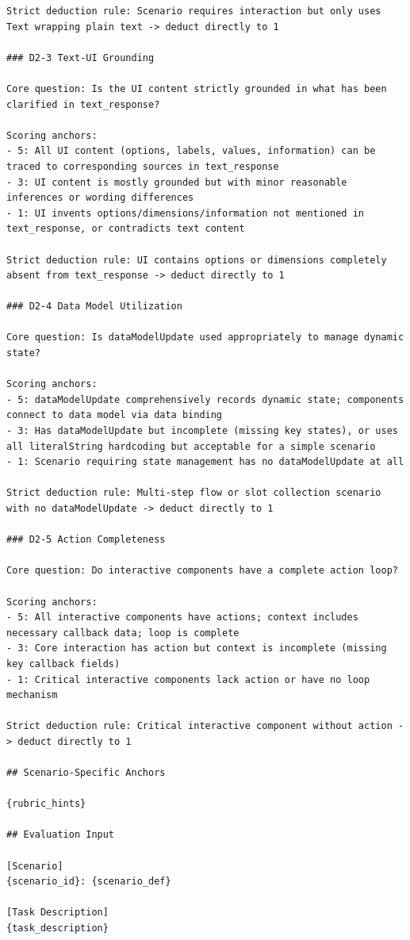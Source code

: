 \documentclass{llmxive}
\begin{document}
\begin{verbatim}
Strict deduction rule: Scenario requires interaction but only uses Text wrapping plain text -> deduct directly to 1

### D2-3 Text-UI Grounding

Core question: Is the UI content strictly grounded in what has been clarified in text_response?

Scoring anchors:
- 5: All UI content (options, labels, values, information) can be traced to corresponding sources in text_response
- 3: UI content is mostly grounded but with minor reasonable inferences or wording differences
- 1: UI invents options/dimensions/information not mentioned in text_response, or contradicts text content

Strict deduction rule: UI contains options or dimensions completely absent from text_response -> deduct directly to 1

### D2-4 Data Model Utilization

Core question: Is dataModelUpdate used appropriately to manage dynamic state?

Scoring anchors:
- 5: dataModelUpdate comprehensively records dynamic state; components connect to data model via data binding
- 3: Has dataModelUpdate but incomplete (missing key states), or uses all literalString hardcoding but acceptable for a simple scenario
- 1: Scenario requiring state management has no dataModelUpdate at all

Strict deduction rule: Multi-step flow or slot collection scenario with no dataModelUpdate -> deduct directly to 1

### D2-5 Action Completeness

Core question: Do interactive components have a complete action loop?

Scoring anchors:
- 5: All interactive components have actions; context includes necessary callback data; loop is complete
- 3: Core interaction has action but context is incomplete (missing key callback fields)
- 1: Critical interactive components lack action or have no loop mechanism

Strict deduction rule: Critical interactive component without action -> deduct directly to 1

## Scenario-Specific Anchors

{rubric_hints}

## Evaluation Input

[Scenario]
{scenario_id}: {scenario_def}

[Task Description]
{task_description}


\end{verbatim}
\end{document}
